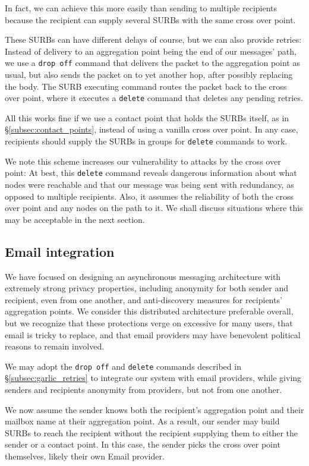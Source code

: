 In fact, we can achieve this more easily than sending to multiple
recipients because the recipient can supply several SURBs with the
same cross over point.

These SURBs can have different delays of course, but we can also
provide retries:  Instead of delivery to an aggregation point being
the end of our messages' path, we use a {\tt drop off} command that
delivers the packet to the aggregation point as usual, but also sends
the packet on to yet another hop, after possibly replacing the body.
The SURB executing command routes the packet back to the cross over
point, where it executes a {\tt delete} command that deletes any
pending retries.

All this works fine if we use a contact point that holds the SURBs
itself, as in \S\ref{subsec:contact_points}, instead of using a
vanilla cross over point.  In any case, recipients should supply the
SURBs in groups for {\tt delete} commands to work.

We note this scheme increases our vulnerability to attacks by the
cross over point:  At best, this {\tt delete} command reveals
dangerous information about what nodes were reachable and that our
message was being sent with redundancy, as opposed to multiple 
recipients.  Also, it assumes the reliability of both the cross over
point and any nodes on the path to it.
%
We shall discuss situations where this may be acceptable in the next section.


\subsection{Email integration}\label{subsec:LEAP}

We have focused on designing an asynchronous messaging architecture
with extremely strong privacy properties, including anonymity for both
sender and recipient, even from one another, and anti-discovery
measures for recipients' aggregation points.  
%
We consider this distributed architecture preferable overall, but
we recognize that these protections verge on excessive for many users,
that email is tricky to replace, and that email providers may have
benevolent political reasons to remain involved.

We may adopt the {\tt drop off} and {\tt delete} commands described
in \S\ref{subsec:garlic_retries} to integrate our system with email
providers, while giving senders and recipients anonymity from
providers, but not from one another.

We now assume the sender knows both the recipient's aggregation point
and their mailbox name at their aggregation point.  As a result, our
sender may build SURBs to reach the recipient without the recipient
supplying them to either the sender or a contact point.  
In this case, the sender picks the cross over point themselves, 
likely their own Email provider.

